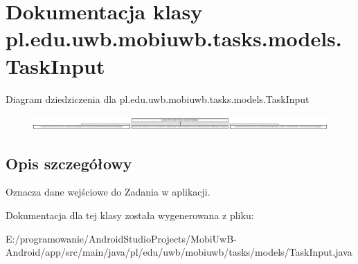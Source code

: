 \hypertarget{classpl_1_1edu_1_1uwb_1_1mobiuwb_1_1tasks_1_1models_1_1_task_input}{}\section{Dokumentacja klasy pl.\+edu.\+uwb.\+mobiuwb.\+tasks.\+models.\+Task\+Input}
\label{classpl_1_1edu_1_1uwb_1_1mobiuwb_1_1tasks_1_1models_1_1_task_input}
Diagram dziedziczenia dla pl.\+edu.\+uwb.\+mobiuwb.\+tasks.\+models.\+Task\+Input\begin{figure}[H]
\begin{center}
\leavevmode
\includegraphics[height=0.544218cm]{classpl_1_1edu_1_1uwb_1_1mobiuwb_1_1tasks_1_1models_1_1_task_input}
\end{center}
\end{figure}


\subsection{Opis szczegółowy}
Oznacza dane wejściowe do Zadania w aplikacji. 

Dokumentacja dla tej klasy została wygenerowana z pliku\+:\begin{DoxyCompactItemize}
\item 
E\+:/programowanie/\+Android\+Studio\+Projects/\+Mobi\+Uw\+B-\/\+Android/app/src/main/java/pl/edu/uwb/mobiuwb/tasks/models/Task\+Input.\+java\end{DoxyCompactItemize}
